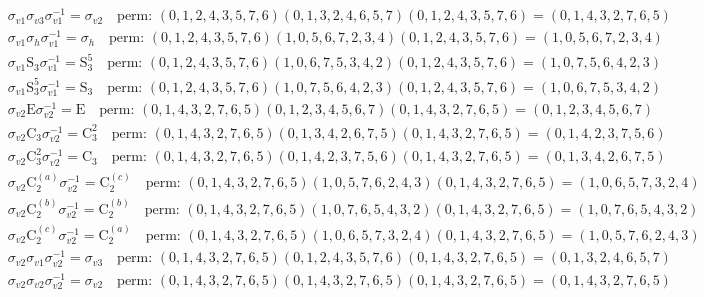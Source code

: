 \begin{align*}
& \sigma_{v1} \sigma_{v3} \sigma_{v1}^{-1} = \sigma_{v2} \quad \text{perm: }(0, 1, 2, 4, 3, 5, 7, 6)(0, 1, 3, 2, 4, 6, 5, 7)(0, 1, 2, 4, 3, 5, 7, 6) = (0, 1, 4, 3, 2, 7, 6, 5) \\
& \sigma_{v1} \sigma_{h} \sigma_{v1}^{-1} = \sigma_{h} \quad \text{perm: }(0, 1, 2, 4, 3, 5, 7, 6)(1, 0, 5, 6, 7, 2, 3, 4)(0, 1, 2, 4, 3, 5, 7, 6) = (1, 0, 5, 6, 7, 2, 3, 4) \\
& \sigma_{v1} \mathrm{S}_{3} \sigma_{v1}^{-1} = \mathrm{S}_{3}^{5} \quad \text{perm: }(0, 1, 2, 4, 3, 5, 7, 6)(1, 0, 6, 7, 5, 3, 4, 2)(0, 1, 2, 4, 3, 5, 7, 6) = (1, 0, 7, 5, 6, 4, 2, 3) \\
& \sigma_{v1} \mathrm{S}_{3}^{5} \sigma_{v1}^{-1} = \mathrm{S}_{3} \quad \text{perm: }(0, 1, 2, 4, 3, 5, 7, 6)(1, 0, 7, 5, 6, 4, 2, 3)(0, 1, 2, 4, 3, 5, 7, 6) = (1, 0, 6, 7, 5, 3, 4, 2) \\
& \sigma_{v2} \mathrm{E} \sigma_{v2}^{-1} = \mathrm{E} \quad \text{perm: }(0, 1, 4, 3, 2, 7, 6, 5)(0, 1, 2, 3, 4, 5, 6, 7)(0, 1, 4, 3, 2, 7, 6, 5) = (0, 1, 2, 3, 4, 5, 6, 7) \\
& \sigma_{v2} \mathrm{C}_{3} \sigma_{v2}^{-1} = \mathrm{C}_{3}^{2} \quad \text{perm: }(0, 1, 4, 3, 2, 7, 6, 5)(0, 1, 3, 4, 2, 6, 7, 5)(0, 1, 4, 3, 2, 7, 6, 5) = (0, 1, 4, 2, 3, 7, 5, 6) \\
& \sigma_{v2} \mathrm{C}_{3}^{2} \sigma_{v2}^{-1} = \mathrm{C}_{3} \quad \text{perm: }(0, 1, 4, 3, 2, 7, 6, 5)(0, 1, 4, 2, 3, 7, 5, 6)(0, 1, 4, 3, 2, 7, 6, 5) = (0, 1, 3, 4, 2, 6, 7, 5) \\
& \sigma_{v2} \mathrm{C}_{2}^{(a)} \sigma_{v2}^{-1} = \mathrm{C}_{2}^{(c)} \quad \text{perm: }(0, 1, 4, 3, 2, 7, 6, 5)(1, 0, 5, 7, 6, 2, 4, 3)(0, 1, 4, 3, 2, 7, 6, 5) = (1, 0, 6, 5, 7, 3, 2, 4) \\
& \sigma_{v2} \mathrm{C}_{2}^{(b)} \sigma_{v2}^{-1} = \mathrm{C}_{2}^{(b)} \quad \text{perm: }(0, 1, 4, 3, 2, 7, 6, 5)(1, 0, 7, 6, 5, 4, 3, 2)(0, 1, 4, 3, 2, 7, 6, 5) = (1, 0, 7, 6, 5, 4, 3, 2) \\
& \sigma_{v2} \mathrm{C}_{2}^{(c)} \sigma_{v2}^{-1} = \mathrm{C}_{2}^{(a)} \quad \text{perm: }(0, 1, 4, 3, 2, 7, 6, 5)(1, 0, 6, 5, 7, 3, 2, 4)(0, 1, 4, 3, 2, 7, 6, 5) = (1, 0, 5, 7, 6, 2, 4, 3) \\
& \sigma_{v2} \sigma_{v1} \sigma_{v2}^{-1} = \sigma_{v3} \quad \text{perm: }(0, 1, 4, 3, 2, 7, 6, 5)(0, 1, 2, 4, 3, 5, 7, 6)(0, 1, 4, 3, 2, 7, 6, 5) = (0, 1, 3, 2, 4, 6, 5, 7) \\
& \sigma_{v2} \sigma_{v2} \sigma_{v2}^{-1} = \sigma_{v2} \quad \text{perm: }(0, 1, 4, 3, 2, 7, 6, 5)(0, 1, 4, 3, 2, 7, 6, 5)(0, 1, 4, 3, 2, 7, 6, 5) = (0, 1, 4, 3, 2, 7, 6, 5) \\

\end{align*}
